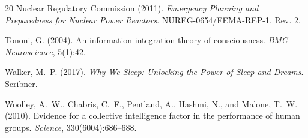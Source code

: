 \documentclass[11pt,a4paper]{article}
\begin{document}
\begin{thebibliography}{20}
Nuclear Regulatory Commission (2011).
\newblock \emph{Emergency Planning and Preparedness for Nuclear Power Reactors}.
\newblock NUREG-0654/FEMA-REP-1, Rev. 2.

Tononi, G. (2004).
\newblock An information integration theory of consciousness.
\newblock \emph{BMC Neuroscience}, 5(1):42.

Walker, M.~P. (2017).
\newblock \emph{Why We Sleep: Unlocking the Power of Sleep and Dreams}.
\newblock Scribner.

Woolley, A.~W., Chabris, C.~F., Pentland, A., Hashmi, N., and Malone, T.~W. (2010).
\newblock Evidence for a collective intelligence factor in the performance of human groups.
\newblock \emph{Science}, 330(6004):686--688.

\end{thebibliography}
\end{document}
